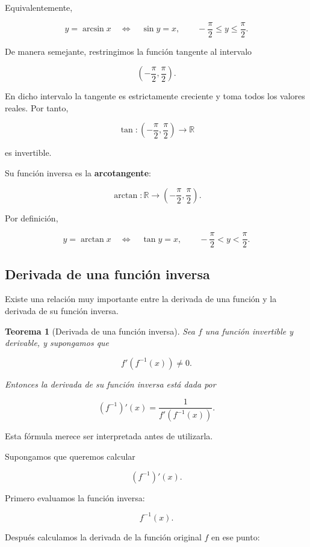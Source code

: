 \documentclass[12pt]{article}
\newtheorem{teorema}{Teorema}[section]
\theoremstyle{definition}
\theoremstyle{remark}
\begin{document}
Equivalentemente,

\[
\boxed{
y=\arcsin x
\quad\Longleftrightarrow\quad
\sin y=x,
\qquad
-\frac{\pi}{2}\leq y\leq\frac{\pi}{2}.
}
\]

De manera semejante, restringimos la función tangente al intervalo

\[
\left(-\frac{\pi}{2},\frac{\pi}{2}\right).
\]

En dicho intervalo la tangente es estrictamente creciente y toma todos
los valores reales. Por tanto,

\[
\tan:
\left(-\frac{\pi}{2},\frac{\pi}{2}\right)
\longrightarrow\mathbb{R}
\]

es invertible.

Su función inversa es la \textbf{arcotangente}:

\[
\arctan:
\mathbb{R}
\longrightarrow
\left(-\frac{\pi}{2},\frac{\pi}{2}\right).
\]

Por definición,

\[
\boxed{
y=\arctan x
\quad\Longleftrightarrow\quad
\tan y=x,
\qquad
-\frac{\pi}{2}<y<\frac{\pi}{2}.
}
\]

\subsection*{Derivada de una función inversa}

Existe una relación muy importante entre la derivada de una función y
la derivada de su función inversa.

\begin{teorema}[Derivada de una función inversa]
Sea $f$ una función invertible y derivable, y supongamos que

\[
f'(f^{-1}(x))\neq 0.
\]

Entonces la derivada de su función inversa está dada por

\[
\boxed{
(f^{-1})'(x)
=
\frac{1}{f'(f^{-1}(x))}.
}
\]
\end{teorema}

Esta fórmula merece ser interpretada antes de utilizarla.

Supongamos que queremos calcular

\[
(f^{-1})'(x).
\]

Primero evaluamos la función inversa:

\[
f^{-1}(x).
\]

Después calculamos la derivada de la función original $f$ en ese punto:
\end{document}
